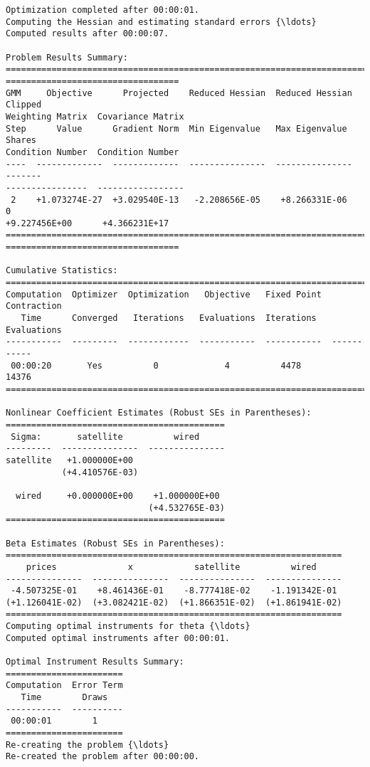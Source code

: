 \begin{Verbatim}[commandchars=\\\{\}]
Optimization completed after 00:00:01.
Computing the Hessian and estimating standard errors {\ldots}
Computed results after 00:00:07.

Problem Results Summary:
================================================================================
==================================
GMM     Objective      Projected    Reduced Hessian  Reduced Hessian  Clipped
Weighting Matrix  Covariance Matrix
Step      Value      Gradient Norm  Min Eigenvalue   Max Eigenvalue   Shares
Condition Number  Condition Number
----  -------------  -------------  ---------------  ---------------  -------
----------------  -----------------
 2    +1.073274E-27  +3.029540E-13   -2.208656E-05    +8.266331E-06      0
+9.227456E+00      +4.366231E+17
================================================================================
==================================

Cumulative Statistics:
===========================================================================
Computation  Optimizer  Optimization   Objective   Fixed Point  Contraction
   Time      Converged   Iterations   Evaluations  Iterations   Evaluations
-----------  ---------  ------------  -----------  -----------  -----------
 00:00:20       Yes          0             4          4478         14376
===========================================================================

Nonlinear Coefficient Estimates (Robust SEs in Parentheses):
===========================================
 Sigma:       satellite          wired
---------  ---------------  ---------------
satellite   +1.000000E+00
           (+4.410576E-03)

  wired     +0.000000E+00    +1.000000E+00
                            (+4.532765E-03)
===========================================

Beta Estimates (Robust SEs in Parentheses):
==================================================================
    prices              x            satellite          wired
---------------  ---------------  ---------------  ---------------
 -4.507325E-01    +8.461436E-01    -8.777418E-02    -1.191342E-01
(+1.126041E-02)  (+3.082421E-02)  (+1.866351E-02)  (+1.861941E-02)
==================================================================
Computing optimal instruments for theta {\ldots}
Computed optimal instruments after 00:00:01.

Optimal Instrument Results Summary:
=======================
Computation  Error Term
   Time        Draws
-----------  ----------
 00:00:01        1
=======================
Re-creating the problem {\ldots}
Re-created the problem after 00:00:00.


\end{Verbatim}

